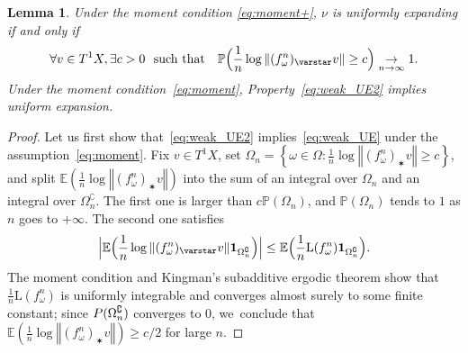 \documentclass[JEP,XML,SOM,Unicode,published]{cedram}
\let\sep :
\newcommand{\set}[1]{\left\{#1\right\}}
\newcommand{\norm}[1]{{\left\Vert#1\right\Vert}}
\newcommand{\Babs}[1]{\Bigl\vert#1\Bigr\vert}
\newcommand{\unsur}[1]{\frac{1}{#1}}
\newcommand{\lrpar}[1]{\left(#1\right)}
\newcommand{\Blrpar}[1]{\Bigl(#1\Bigr)}
\newcommand{\ee}{\mathbb{E}}
\newcommand{\pp}{\mathbb{P}}\let\P\pp
\theoremstyle{plain}
\newtheorem{lem}[thm]{Lemma}
\theoremstyle{definition}
\begin{document}
\begin{lem}\label{lem:weak_UE2}
Under the moment condition \eqref{eq:moment+}, $\nu$ is uniformly expanding if and only
if
\begin{equation}\label{eq:weak_UE2}
\forall v \in T^1X, \exists c>0 \ \text{ such that} \quad
\pp\Blrpar{ \unsur{n}\log \norm{ (f^n_\omega)_\varstar v} \geq c} \underset{n\to\infty}{\to} 1.
\end{equation}
Under the moment condition~\eqref{eq:moment}, Property~\eqref{eq:weak_UE2} implies uniform expansion.
\end{lem}

\begin{proof}
Let us first show that~\eqref{eq:weak_UE2} implies~\eqref{eq:weak_UE} under the assumption~\eqref{eq:moment}.
Fix $ v\in T^1X$,
set $\Omega_n = \set{ \omega\in \Omega \sep  \unsur{n}\log \norm{ (f^n_\omega)_\varstar v} \geq c}$, and split
$\ee\lrpar{\unsur{n}\log \norm{ (f^n_\omega)_\varstar v}}$ into the sum of an integral over $\Omega_n$ and an integral over $\Omega_n^\complement$. The first one is larger than $c \pp(\Omega_n)$, and $\pp(\Omega_n)$ tends to $1$ as $n$ goes to $+\infty$. The second one satisfies
\[
\Babs{\ee\Blrpar{\unsur{n}\log \norm{ (f^n_\omega)_\varstar v} \mathbf 1_{\Omega_n^\complement} } }\leq
\ee \Blrpar{ \unsur{n} \mathrm L (f^n_\omega) \mathbf 1_{\Omega_n^\complement} } .
\]
The moment condition and Kingman's subadditive ergodic theorem show that $ \unsur{n} \mathrm L(f^n_\omega)$ is uniformly integrable and converges almost surely to some finite constant; since $ \mathbf \pp({\Omega_n^\complement}) $ converges to $0$, we~conclude that $ \ee\lrpar{\unsur{n}\log \norm{ (f^n_\omega)_\varstar v}}\geq c/2$ for large $n$.


\end{proof}
\end{document}
